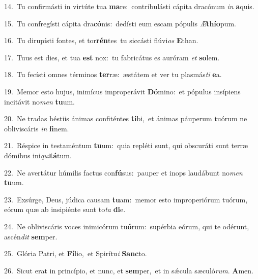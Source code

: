 {\numbfont\textcolor{\numbcolor}{14.}}~Tu confirmásti in virtúte tua \textbf{ma}\-re:~\star contribulásti cápita dracónum \textit{in} \textbf{a}\-quis.\par
{\numbfont\textcolor{\numbcolor}{15.}}~Tu confregísti cápita dra\-\textbf{có}\-nis:~\star dedísti eum escam pópulis \textit{Æ}\-\textbf{thí}\textbf{o}pum.\par
{\numbfont\textcolor{\numbcolor}{16.}}~Tu dirupísti fontes, et tor\-\textbf{rén}\-tes~\star tu siccásti flúvi\textit{os} \textbf{E}\-than.\par
{\numbfont\textcolor{\numbcolor}{17.}}~Tuus est dies, et tua \textbf{est} nox:~\star tu fabricátus es auróram \textit{et} \textbf{so}\-lem.\par
{\numbfont\textcolor{\numbcolor}{18.}}~Tu fecísti omnes términos \textbf{ter}\-ræ:~\star æstátem et ver tu plasmás\textit{ti} \textbf{e}\-a.\par
{\numbfont\textcolor{\numbcolor}{19.}}~Memor esto hujus, inimícus improperávit \textbf{Dó}\-mino:~\star et pópulus insípiens incitávit no\textit{men} \textbf{tu}\-um.\par
{\numbfont\textcolor{\numbcolor}{20.}}~Ne tradas béstiis ánimas confiténtes \textbf{ti}\-bi,~\star et ánimas páuperum tuórum ne obliviscáris \textit{in} \textbf{fi}\-nem.\par
{\numbfont\textcolor{\numbcolor}{21.}}~Réspice in testaméntum \textbf{tu}\-um:~\star quia repléti sunt, qui obscuráti sunt terræ dómibus ini\-\textit{qui}\-\textbf{tá}tum.\par
{\numbfont\textcolor{\numbcolor}{22.}}~Ne avertátur húmilis factus con\-\textbf{fú}\-sus:~\star pauper et inops laudábunt no\textit{men} \textbf{tu}\-um.\par
{\numbfont\textcolor{\numbcolor}{23.}}~Exsúrge, Deus, júdica causam \textbf{tu}\-am:~\star memor esto improperiórum tuórum, eórum quæ ab insipiénte sunt to\textit{ta} \textbf{di}\-e.\par
{\numbfont\textcolor{\numbcolor}{24.}}~Ne obliviscáris voces inimicórum tu\-\textbf{ó}\-rum:~\star supérbia eórum, qui te odérunt, ascén\textit{dit} \textbf{sem}\-per.\par
{\numbfont\textcolor{\numbcolor}{25.}}~Glória Patri, et \textbf{Fí}\-lio,~\star et Spirítu\textit{i} \textbf{Sanc}\-to.\par
{\numbfont\textcolor{\numbcolor}{26.}}~Sicut erat in princípio, et nunc, et \textbf{sem}\-per,~\star et in sǽcula sæculó\-\textit{rum}\-. \textbf{A}\-men.\par
